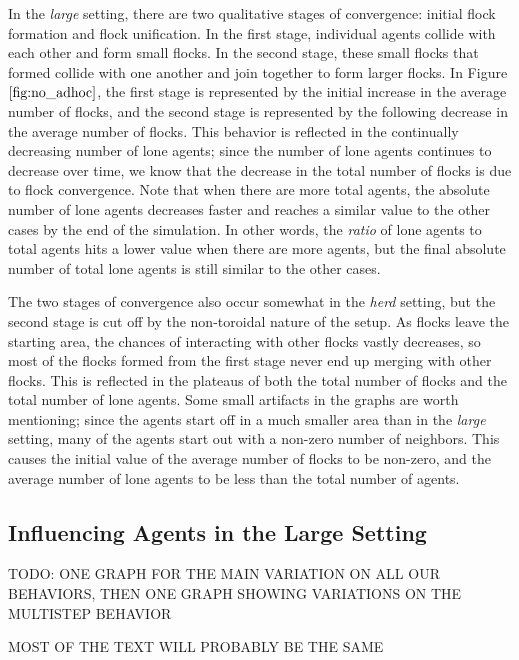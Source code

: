 In the \textit{large} setting, there are two qualitative stages of convergence:
initial flock formation and flock unification.
In the first stage, individual agents collide with each other and form small
flocks.
In the second stage, these small flocks that formed collide with one another and
join together to form larger flocks.
In Figure $\ref{fig:no_adhoc}$, the first stage is represented by the initial
increase in the average number of flocks, and the second stage is represented
by the following decrease in the average number of flocks.
This behavior is reflected in the continually decreasing number of lone agents;
since the number of lone agents continues to decrease over time, we know that the
decrease in the total number of flocks is due to flock convergence.
Note that when there are more total agents, the absolute number of lone agents
decreases faster and reaches a similar value to the other cases by the end of the
simulation.
In other words, the \textit{ratio} of lone agents to total agents hits a
lower value when there are more agents, but the final absolute number of total
lone agents is still similar to the other cases.

The two stages of convergence also occur somewhat in the \textit{herd} setting,
but the second stage is cut off by the non-toroidal nature of the setup.
As flocks leave the starting area, the chances of interacting with other flocks
vastly decreases, so most of the flocks formed from the first stage never end up
merging with other flocks.
This is reflected in the plateaus of both the total number of flocks and the total
number of lone agents.
Some small artifacts in the graphs are worth mentioning; since the agents start off
in a much smaller area than in the \textit{large} setting, many of the agents
start out with a non-zero number of neighbors.
This causes the initial value of the average number of flocks to be non-zero, and
the average number of lone agents to be less than the total number of agents.

\subsection{Influencing Agents in the Large Setting}

TODO: ONE GRAPH FOR THE MAIN VARIATION ON ALL OUR BEHAVIORS, THEN ONE GRAPH
SHOWING VARIATIONS ON THE MULTISTEP BEHAVIOR

MOST OF THE TEXT WILL PROBABLY BE THE SAME


